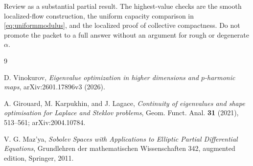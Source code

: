 \documentclass[11pt]{article}
\begin{document}
Review as a substantial partial result. The highest-value checks are the
smooth localized-flow construction, the uniform capacity comparison in
\eqref{eq:uniformmodulus}, and the localized proof of collective compactness.
Do not promote the packet to a full answer without an argument for rough or
degenerate \(\alpha\).

\begin{thebibliography}{9}

D. Vinokurov,
\emph{Eigenvalue optimization in higher dimensions and \(p\)-harmonic maps},
arXiv:2601.17896v3 (2026).

A. Girouard, M. Karpukhin, and J. Lagace,
\emph{Continuity of eigenvalues and shape optimisation for Laplace and
Steklov problems},
Geom. Funct. Anal. \textbf{31} (2021), 513--561;
arXiv:2004.10784.

V. G. Maz'ya,
\emph{Sobolev Spaces with Applications to Elliptic Partial Differential
Equations},
Grundlehren der mathematischen Wissenschaften 342, augmented edition,
Springer, 2011.

\end{thebibliography}
\end{document}
